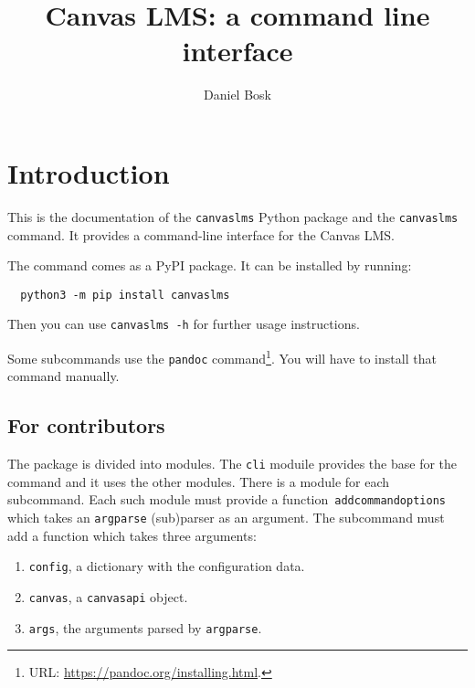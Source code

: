 \documentclass[a4paper,oneside]{book}
\title{%
  Canvas LMS: a command line interface
}
\author{%
  Daniel Bosk
}
\affil{%
  KTH EECS
}
\newenvironment{abstract}{}{}
\begin{document}
\frontmatter
\maketitle

\vspace*{\fill}
\clearpage

\begin{abstract}
  
\end{abstract}
\clearpage


\tableofcontents
\clearpage

\mainmatter


\chapter{Introduction}

This is the documentation of the \texttt{canvaslms} Python package and the 
\texttt{canvaslms} command.
It provides a command-line interface for the Canvas LMS\@.

The command comes as a PyPI package.
It can be installed by running:
\begin{verbatim}
  python3 -m pip install canvaslms
\end{verbatim}
Then you can use \texttt{canvaslms -h} for further usage instructions.

Some subcommands use the \texttt{pandoc} command\footnote{%
  URL: \url{https://pandoc.org/installing.html}.
}.
You will have to install that command manually.


\section{For contributors}

The package is divided into modules.
The \texttt{cli} moduile provides the base for the command and it uses the 
other modules.
There is a module for each subcommand.
Each such module must provide a
function~\texttt{add\textunderscore{}command\textunderscore{}options} which 
takes an \texttt{argparse} (sub)parser as an argument.
The subcommand must add a function which takes three arguments:
\begin{enumerate}
  \item \texttt{config}, a dictionary with the configuration data.
  \item \texttt{canvas}, a \texttt{canvasapi} object.
  \item \texttt{args}, the arguments parsed by \texttt{argparse}.
\end{enumerate}







%
%


\printbibliography
\end{document}
